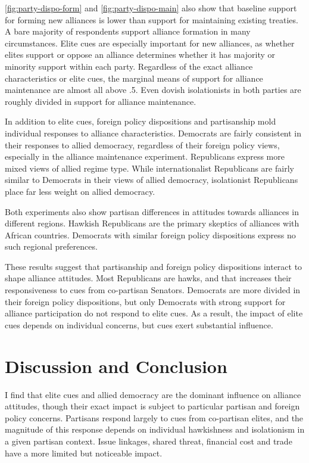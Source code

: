 \documentclass[12pt]{article}
\begin{document}
\autoref{fig:party-dispo-form} and \autoref{fig:party-dispo-main} also show that baseline support for forming new alliances is lower than support for maintaining existing treaties. 
A bare majority of respondents support alliance formation in many circumstances. 
Elite cues are especially important for new alliances, as whether elites support or oppose an alliance determines whether it has majority or minority support within each party. 
Regardless of the exact alliance characteristics or elite cues, the marginal means of support for alliance maintenance are almost all above .5. 
Even dovish isolationists in both parties are roughly divided in support for alliance maintenance.


In addition to elite cues, foreign policy dispositions and partisanship mold individual responses to alliance characteristics. 
Democrats are fairly consistent in their responses to allied democracy, regardless of their foreign policy views, especially in the alliance maintenance experiment. 
Republicans express more mixed views of allied regime type. 
While internationalist Republicans are fairly similar to Democrats in their views of allied democracy, isolationist Republicans place far less weight on allied democracy. 


Both experiments also show partisan differences in attitudes towards alliances in different regions. 
Hawkish Republicans are the primary skeptics of alliances with African countries. 
Democrats with similar foreign policy dispositions express no such regional preferences. 


These results suggest that partisanship and foreign policy dispositions interact to shape alliance attitudes. 
Most Republicans are hawks, and that increases their responsiveness to cues from co-partisan Senators. 
Democrats are more divided in their foreign policy dispositions, but only Democrats with strong support for alliance participation do not respond to elite cues. 
As a result, the impact of elite cues depends on individual concerns, but cues exert substantial influence. 



\section{Discussion and Conclusion} 

I find that elite cues and allied democracy are the dominant influence on alliance attitudes, though their exact impact is subject to particular partisan and foreign policy concerns. 
Partisans respond largely to cues from co-partisan elites, and the magnitude of this response depends on individual hawkishness and isolationism in a given partisan context. 
Issue linkages, shared threat, financial cost and trade have a more limited but noticeable impact.  
\end{document}
